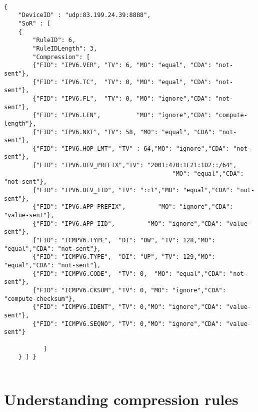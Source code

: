 \begin{lstlisting}[basicstyle=\ttfamily\tiny, caption={rule 6/3 for ping traffic}, caption=fig-rule-ping, backgroundcolor=\color{yellow}]

{
    "DeviceID" : "udp:83.199.24.39:8888",
    "SoR" : [
	{
	    "RuleID": 6,
	    "RuleIDLength": 3,
	    "Compression": [
		{"FID": "IPV6.VER", "TV": 6, "MO": "equal", "CDA": "not-sent"},
		{"FID": "IPV6.TC",  "TV": 0, "MO": "equal", "CDA": "not-sent"},
		{"FID": "IPV6.FL",  "TV": 0, "MO": "ignore","CDA": "not-sent"},
		{"FID": "IPV6.LEN",          "MO": "ignore","CDA": "compute-length"},
		{"FID": "IPV6.NXT", "TV": 58, "MO": "equal", "CDA": "not-sent"},
		{"FID": "IPV6.HOP_LMT", "TV" : 64,"MO": "ignore","CDA": "not-sent"},
		{"FID": "IPV6.DEV_PREFIX","TV": "2001:470:1F21:1D2::/64",
                                               "MO": "equal","CDA": "not-sent"},
		{"FID": "IPV6.DEV_IID", "TV": "::1","MO": "equal","CDA": "not-sent"},
		{"FID": "IPV6.APP_PREFIX",         "MO": "ignore","CDA": "value-sent"},
		{"FID": "IPV6.APP_IID",         "MO": "ignore","CDA": "value-sent"},
		{"FID": "ICMPV6.TYPE",  "DI": "DW", "TV": 128,"MO": "equal","CDA": "not-sent"},
		{"FID": "ICMPV6.TYPE",  "DI": "UP", "TV": 129,"MO": "equal","CDA": "not-sent"},
		{"FID": "ICMPV6.CODE",  "TV": 0,  "MO": "equal","CDA": "not-sent"},
		{"FID": "ICMPV6.CKSUM", "TV": 0, "MO": "ignore","CDA": "compute-checksum"},
		{"FID": "ICMPV6.IDENT", "TV": 0,"MO": "ignore","CDA": "value-sent"},
		{"FID": "ICMPV6.SEQNO", "TV": 0,"MO": "ignore","CDA": "value-sent"}
		
	       ]
	} ] }
	
\end{lstlisting}



\section{Understanding compression rules}

